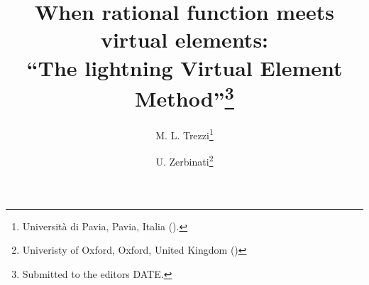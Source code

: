 

\usepackage{lipsum}
\usepackage{amsfonts}
\usepackage{graphicx}
\usepackage{epstopdf}
\usepackage{algorithmic}
\ifpdf
\else
\fi

\newcommand{\creflastconjunction}{, and~}



\title{When rational function meets virtual elements:\\``The lightning Virtual Element Method''\thanks{Submitted to the editors DATE.
}}

\author{M. L. Trezzi\thanks{Università di Pavia, Pavia, Italia 
  ().}
\and U. Zerbinati\thanks{Univeristy of Oxford, Oxford, United Kingdom
  ()}
}

\usepackage{amsopn}
\DeclareMathOperator{\diag}{diag}



